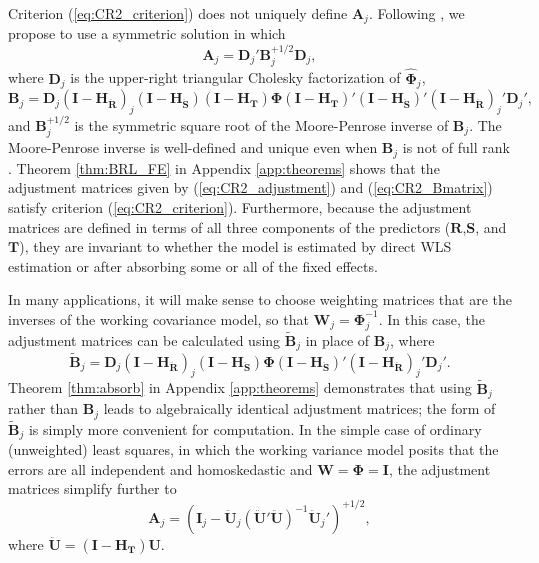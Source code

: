 \documentclass[12pt]{article}\usepackage[]{graphicx}\usepackage[]{color}
\newcommand{\bm}{\mathbf}
\newcommand{\bs}{\boldsymbol}
\begin{document}
Criterion (\ref{eq:CR2_criterion}) does not uniquely define $\bm{A}_j$. Following \citet{McCaffrey2001generalizations}, we propose to use a symmetric solution in which
\begin{equation}
\label{eq:CR2_adjustment}
\bm{A}_j = \bm{D}_j' \bm{B}_j^{+1/2} \bm{D}_j,
\end{equation}
where $\bm{D}_j$ is the upper-right triangular Cholesky factorization of $\hat{\bs\Phi}_j$, 
\begin{equation}
\label{eq:CR2_Bmatrix}
\bm{B}_j = \bm{D}_j\left(\bm{I} - \bm{H_{\ddot{R}}}\right)_j \left(\bm{I} - \bm{H_{\ddot{S}}}\right) \left(\bm{I} - \bm{H_T}\right) \bs\Phi \left(\bm{I} - \bm{H_T}\right)' \left(\bm{I} - \bm{H_{\ddot{S}}}\right)' \left(\bm{I} - \bm{H_{\ddot{R}}}\right)_j' \bm{D}_j',
\end{equation}
and $\bm{B}_j^{+1/2}$ is the symmetric square root of the Moore-Penrose inverse of $\bm{B}_j $. 
The Moore-Penrose inverse is well-defined and unique even when $\bm{B}_j$ is not of full rank \citep[][Thm. 9.18]{Banerjee2014linear}.
Theorem \ref{thm:BRL_FE} in Appendix \ref{app:theorems} shows that the adjustment matrices given by (\ref{eq:CR2_adjustment}) and (\ref{eq:CR2_Bmatrix}) satisfy criterion (\ref{eq:CR2_criterion}). Furthermore, because the adjustment matrices are defined in terms of all three components of the predictors ($\bm{R}$,$\bm{S}$, and $\bm{T}$), they are invariant to whether the model is estimated by direct WLS estimation or after absorbing some or all of the fixed effects. 

In many applications, it will make sense to choose weighting matrices that are the inverses of the working covariance model, so that $\bm{W}_j = \bs\Phi_j^{-1}$. In this case, the adjustment matrices can be calculated using $\bm{\tilde{B}}_j$ in place of $\bm{B}_j$, where
\begin{equation}
\label{eq:CR2_B_tilde}
\bm{\tilde{B}}_j = \bm{D}_j\left(\bm{I} - \bm{H_{\ddot{R}}}\right)_j \left(\bm{I} - \bm{H_{\ddot{S}}}\right) \bs\Phi \left(\bm{I} - \bm{H_{\ddot{S}}}\right)' \left(\bm{I} - \bm{H_{\ddot{R}}}\right)_j' \bm{D}_j'.
\end{equation}
Theorem \ref{thm:absorb} in Appendix \ref{app:theorems} demonstrates that using $\bm{\tilde{B}}_j$ rather than $\bm{B}_j$ leads to algebraically identical adjustment matrices; the form of $\bm{\tilde{B}}_j$ is simply more convenient for computation.
In the simple case of ordinary (unweighted) least squares, in which the working variance model posits that the errors are all independent and homoskedastic and $\bm{W} = \bs\Phi = \bm{I}$, the adjustment matrices simplify further to \[
\bm{A}_j = \left(\bm{I}_j - \bm{\ddot{U}}_j\left(\bm{\ddot{U}}'\bm{\ddot{U}}\right)^{-1}\bm{\ddot{U}}_j'\right)^{+1/2},\]
where $\bm{\ddot{U}} = \left(\bm{I} - \bm{H_T}\right)\bm{U}$.
\end{document}

